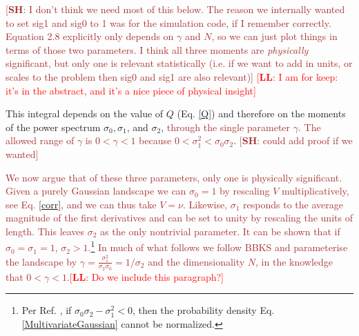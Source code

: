 \documentclass[12pt]{article}
\newcommand{\re}[1]{\textcolor{blue}{[{\bf RE}: #1]}}
\newcommand{\lfl}[1]{\textcolor{red}{[{\bf LL}: #1]}}
\newcommand{\SH}[1]{\textcolor{brown}{[{\bf SH}: #1]}}
\newcommand{\sh}[1]{\textcolor{brown}{#1}}
\begin{document}
\SH{I don't think we need most of this below. The reason we internally wanted to set sig1 and sig0 to 1 was for the simulation code, if I remember correctly. Equation 2.8 explicitly only depends on $\gamma$ and $N$, so we can just plot things in terms of those two parameters. I think all three moments are \emph{physically} significant, but only one is relevant statistically (i.e. if we want to add in units, or scales to the problem then sig0 and sig1 are also relevant)} \lfl{I am for keep: it's in the abstract, and it's a nice piece of physical insight}

This integral depends on the value of $Q$ (Eq. \ref{Q}) and therefore on the moments of the power spectrum $\sigma_0, \sigma_1$,  and $\sigma_2$, \sh{through the single parameter $\gamma$. The allowed range of $\gamma$ is $0<\gamma<1$ because $0<\sigma_1^2<\sigma_0\sigma_2$}. \SH{could add proof if we wanted}

\sh{We now argue that of these three parameters, only one is physically significant. Given a purely Gaussian landscape we can $\sigma_0=1$ by rescaling $V$ multiplicatively, see Eq. \ref{corr}, and we can thus take $V = \nu$. Likewise, $\sigma_1$ responds to the average magnitude of the first derivatives and can be set to unity by rescaling the units of length. This leaves $\sigma_2$ as the only nontrivial parameter. It can be shown that if $\sigma_0=\sigma_1=1$, $\sigma_2>1$.\footnote{Per Ref. \cite{Yamada2018}, if $\sigma_0\sigma_2 - \sigma_1^2 < 0$, then the probability density Eq. \ref{MultivariateGaussian} cannot be normalized.} In much of what follows we follow BBKS and parameterise the landscape by $\gamma = \frac{\sigma_1^2}{\sigma_2 \sigma_0}=1/\sigma_2$ and the dimensionality $N$,  in the knowledge that $0<\gamma<1$.}\lfl{Do we include this paragraph?}


\end{document}
